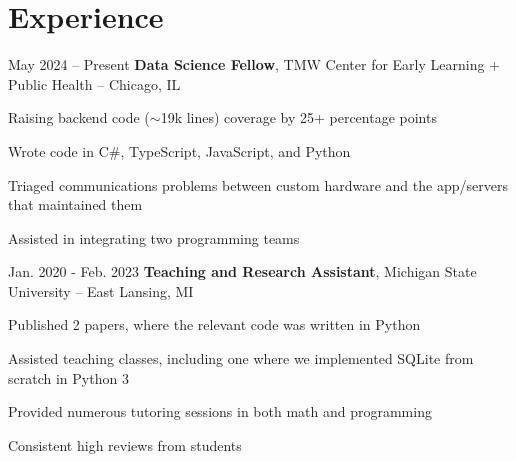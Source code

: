 

	\section{Experience}

	\begin{twocolentry}
		{ May 2024 – Present } \textbf{Data Science Fellow}, TMW Center for Early Learning
		+ Public Health -- Chicago, IL
	\end{twocolentry}

	\vspace{0.10 cm}
	\begin{onecolentry}
		\begin{highlights}
			\item Raising backend code ($\sim$19k lines) coverage by 25+ percentage points
			\item Wrote code in C\#, TypeScript, JavaScript, and Python
			\item Triaged communications problems between custom hardware and the app/servers that maintained them
			\item Assisted in integrating two programming teams
		\end{highlights}
	\end{onecolentry}

	\vspace{0.2 cm}

	\begin{twocolentry}
		{ Jan. 2020 - Feb. 2023 } \textbf{Teaching and Research Assistant}, Michigan
		State University -- East Lansing, MI
	\end{twocolentry}

	\vspace{0.10 cm}
	\begin{onecolentry}
		\begin{highlights}
			\item Published 2 papers, where the relevant code was written in Python
			\item Assisted teaching classes, including one where we implemented SQLite from scratch in Python 3
			\item Provided numerous tutoring sessions in both math and programming
			\item Consistent high reviews from students
		\end{highlights}
	\end{onecolentry}

	\vspace{0.2 cm}

